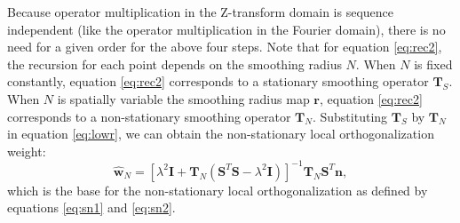 
Because operator multiplication in the Z-transform domain is sequence independent (like the operator multiplication in the Fourier domain), there is no need for a given order for the above four steps. Note that for equation \ref{eq:rec2}, the recursion for each point depends on the smoothing radius $N$. When $N$ is fixed constantly, equation \ref{eq:rec2} corresponds to a stationary smoothing operator $\mathbf{T}_S$. When $N$ is spatially variable  the smoothing radius map $\mathbf{r}$, equation \ref{eq:rec2} corresponds to a non-stationary smoothing operator $\mathbf{T}_N$. Substituting $\mathbf{T}_S$ by $\mathbf{T}_N$ in equation \ref{eq:lowr}, we can obtain the non-stationary local orthogonalization weight: 
\begin{equation}
\label{eq:lowrn}
\hat{\mathbf{w}}_N = [\lambda^2 \mathbf{I} + \mathbf{T}_N (\mathbf{S}^T\mathbf{S} -\lambda^2 \mathbf{I})]^{-1}\mathbf{T}_N\mathbf{S}^T\mathbf{n}, 
\end{equation} 
which is the base for the non-stationary local orthogonalization as defined by equations \ref{eq:sn1} and \ref{eq:sn2}.

